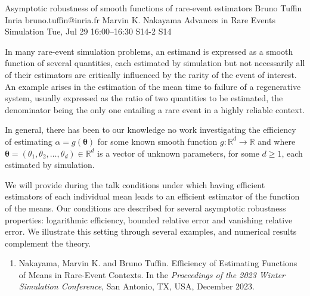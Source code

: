 \begin{talk}
  {Asymptotic robustness of  smooth functions of  rare-event estimators}%
  {Bruno Tuffin}%
  {Inria}%
  {bruno.tuffin@inria.fr}%
  {Marvin K. Nakayama}%
  {Advances in Rare Events Simulation}%
  {Tue, Jul 29 16:00--16:30}%
  {S14-2}%
  {S14}%
    
   
In many rare-event simulation problems, an estimand is expressed  as a smooth function of several quantities,  each
estimated by simulation  but not necessarily all of their estimators are critically influenced by
the rarity of the event of interest.  
An example arises in the estimation of the mean time to failure of a regenerative system, usually expressed as the ratio of two quantities to be estimated, the denominator being the only one  entailing a rare event in a highly reliable context.

In general, there has been to our knowledge no work investigating  the efficiency  of estimating $\alpha = g({\boldsymbol{\theta}})$
for some known  smooth function $g : \mathbb{R}^d \to \mathbb{R}$ and where ${\boldsymbol{\theta}} = (\theta_1, \theta_2, \ldots, \theta_d) \in \mathbb{R}^d$ is a vector of unknown parameters, for some $d \geq 1$, each  estimated by simulation.

We will provide during the talk conditions under which having efficient estimators of each individual mean leads to an efficient estimator of the function of the means. Our conditions are described for several asymptotic robustness properties: logarithmic efficiency, bounded relative error and vanishing relative error.
We illustrate this setting through several examples, and numerical results complement the theory.


   

\medskip


\begin{enumerate}
 \item[{[1]}]  Nakayama, Marvin K. and Bruno Tuffin.  Efficiency of Estimating Functions of Means in Rare-Event Contexts. In the {\it Proceedings of the 2023 Winter Simulation Conference}, San Antonio, TX, USA, December 2023.
\end{enumerate}

\end{talk}

